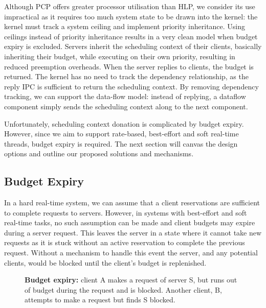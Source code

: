 Although \gls{PCP} offers greater processor utilisation than \gls{HLP}, we consider its use impractical as it requires too much system state to be drawn into the kernel: the kernel must track a system ceiling and implement priority inheritance.
Using ceilings instead of priority inheritance results in a very clean model when budget expiry is excluded.
Servers inherit the scheduling context of their clients, basically inheriting their budget, while executing on their own priority, resulting in reduced preemption overheads.
When the server replies to clients, the budget is returned.
The kernel has no need to track the dependency relationship, as the reply \gls{IPC} is sufficient to return the scheduling context.
By removing dependency tracking, we can support the data-flow model: instead of replying, a dataflow component simply sends the scheduling context along to the next component.

Unfortunately, scheduling context donation is complicated by budget expiry.
However, since we aim to support rate-based, best-effort and soft real-time threads, budget expiry is required.
The next section will canvas the design options and outline our proposed solutions and mechanisms.

\subsection{Budget Expiry}

In a hard real-time system, we can assume that a client reservations are sufficient to complete requests to servers.
However, in systems with best-effort and soft real-time tasks, no such assumption can be made and client budgets may expire during a server request.
This leaves the server in a state where it cannot take new requests as it is stuck without an active reservation to complete the previous request.
Without a mechanism to handle this event the server, and any potential clients, would be blocked until the client's budget is replenished.

\begin{figure}
    \centering
\caption{\textbf{Budget expiry:} client A makes a request of server S, but runs out of budget during the request and is blocked. Another client, B, attempts to make a request but finds S blocked.}
\label{fig:budget-expiry}
\end{figure}


